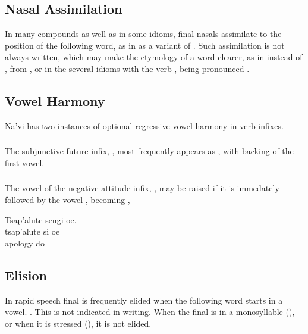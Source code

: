 \subsection{Nasal Assimilation} In many compounds as well as in some
idioms, final nasals assimilate to the position of the following
word, as in  as a variant of .  Such assimilation is
not always written, which may make the etymology of a word clearer, as
in  instead of , from , or in the several
idioms with the verb  ,  being pronounced
.  \label{l-and-s:nasalassim}

\subsection{Vowel Harmony} Na'vi has two instances of optional
regressive vowel harmony in verb infixes.

\subsubsection{} The subjunctive future infix, , most
frequently appears as , with backing of the first vowel.

\subsubsection{}\label{l-and-s:eng}
The vowel of the negative attitude infix, , may be raised
if it is immedately followed by the vowel , becoming ,

\begin{interlin}
\glll Tsap'alute sengi oe. \\
      tsap'alute si oe \\
      apology do  \\
\end{interlin}


\subsection{Elision} In rapid speech final  is frequently elided
when the following word starts in a vowel.  .  This is not indicated in writing.
When the final  is in a monosyllable (), or when it is
stressed (), it is not elided.

